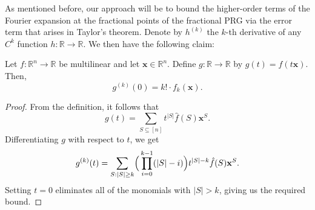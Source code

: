 As mentioned before, our approach will be to bound the higher-order terms of the Fourier expansion at the fractional points of the fractional PRG via the error term that arises in Taylor's theorem. Denote by $h^{(k)}$ the $k$-th derivative of any $C^k$ function $h:\mathbb{R}\to \mathbb{R}$. We then have the following claim:
    \begin{lemma} 
    \label{lem:derivative}
        Let $f:\mathbb{R}^n \to \mathbb{R}  $ be multilinear and let $\mathbf{x} \in \mathbb{R}^n $. 
        Define $g:\mathbb{R} \to \mathbb{R}$ by $g(t) = f(t \mathbf{x}) $. 
        Then, 
        \begin{equation*}
            g^{(k)}(0) = k! \cdot f_k ( \mathbf{x}). 
        \end{equation*}
    \end{lemma}
    \begin{proof}
        From the definition, it follows that 
        \begin{equation*}
            g( t) = \sum_{S \subseteq [ n ] } t^{\vert S\vert} \hat{f}(S) \mathbf{x}^S.
         \end{equation*}
         Differentiating $g$ with respect to $t$, we get 
         \begin{equation*}
            g^{(k)}(t)=\sum_{S: \vert S\vert  \geq k} \Bigl(\, \prod_{i=0}^{k-1}( \vert S\vert-i) \Bigr) t^{ \vert S\vert -k} \hat{f}(S) \mathbf{x}^{S}. 
         \end{equation*}
         Setting $t = 0$ eliminates all of the monomials with $\vert S\vert > k $, giving us the required bound. 
    \end{proof}

